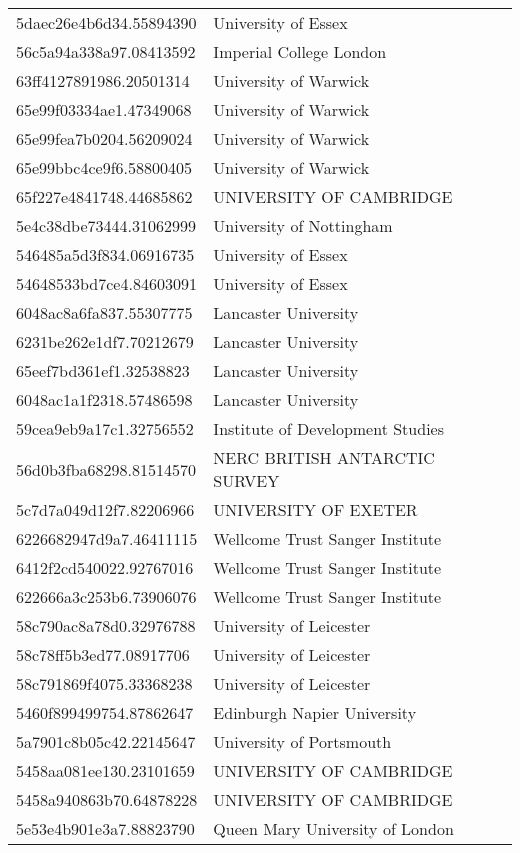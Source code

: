 \begin{tabular}{ll}
5daec26e4b6d34.55894390 & University of Essex \\
56c5a94a338a97.08413592 & Imperial College London \\
63ff4127891986.20501314 & University of Warwick \\
65e99f03334ae1.47349068 & University of Warwick \\
65e99fea7b0204.56209024 & University of Warwick \\
65e99bbc4ce9f6.58800405 & University of Warwick \\
65f227e4841748.44685862 & UNIVERSITY OF CAMBRIDGE \\
5e4c38dbe73444.31062999 & University of Nottingham \\
546485a5d3f834.06916735 & University of Essex \\
54648533bd7ce4.84603091 & University of Essex \\
6048ac8a6fa837.55307775 & Lancaster University \\
6231be262e1df7.70212679 & Lancaster University \\
65eef7bd361ef1.32538823 & Lancaster University \\
6048ac1a1f2318.57486598 & Lancaster University \\
59cea9eb9a17c1.32756552 & Institute of Development Studies \\
56d0b3fba68298.81514570 & NERC BRITISH ANTARCTIC SURVEY \\
5c7d7a049d12f7.82206966 & UNIVERSITY OF EXETER \\
6226682947d9a7.46411115 & Wellcome Trust Sanger Institute \\
6412f2cd540022.92767016 & Wellcome Trust Sanger Institute \\
622666a3c253b6.73906076 & Wellcome Trust Sanger Institute \\
58c790ac8a78d0.32976788 & University of Leicester \\
58c78ff5b3ed77.08917706 & University of Leicester \\
58c791869f4075.33368238 & University of Leicester \\
5460f899499754.87862647 & Edinburgh Napier University \\
5a7901c8b05c42.22145647 & University of Portsmouth \\
5458aa081ee130.23101659 & UNIVERSITY OF CAMBRIDGE \\
5458a940863b70.64878228 & UNIVERSITY OF CAMBRIDGE \\
5e53e4b901e3a7.88823790 & Queen Mary University of London \\

\end{tabular}
